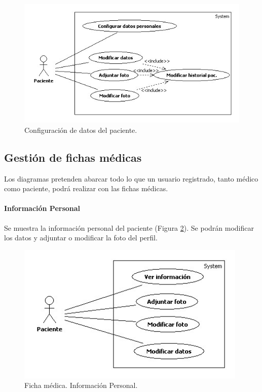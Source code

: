 					\begin{figure}[H]
					  \centering
					    \includegraphics[width=12cm]{img/jpg/casos_uso/Datos.jpg}
					  \caption{Configuración de datos del paciente.}
					  \label{fig:datos_pac}
					\end{figure}



			\subsection{Gestión de fichas médicas} %
			\label{sec:gestion_de_fichas_medicas}

				Los diagramas pretenden abarcar todo lo que un usuario registrado, tanto médico como paciente, podrá realizar con las fichas médicas.
				\paragraph{Información Personal} %
				\label{par:informacion_personal}
					Se muestra la información personal del paciente (Figura \ref{fig:infpers_fic}). Se podrán modificar los datos y adjuntar o modificar la foto del perfil.
					\begin{figure}[H]
					  \centering
					    \includegraphics[width=11cm]{img/jpg/casos_uso/Informacion_personal.jpg}
					  \caption{Ficha médica. Información Personal.}
					  \label{fig:infpers_fic}
					\end{figure}


